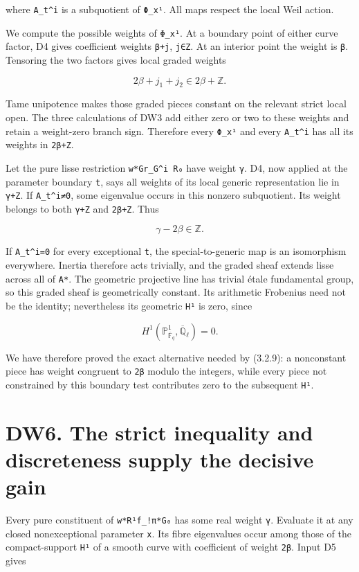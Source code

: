 \documentclass[
]{report}
\newcounter{none} %
\begin{document}
where \texttt{A\_t\^{}i} is a subquotient of \texttt{Φ\_x¹}. All maps
respect the local Weil action.

We compute the possible weights of \texttt{Φ\_x¹}. At a boundary point
of either curve factor, D4 gives coefficient weights \texttt{β+j},
\texttt{j∈Z}. At an interior point the weight is \texttt{β}. Tensoring
the two factors gives local graded weights

\[
2\beta+j_1+j_2\in2\beta+\mathbb Z.
\tag{DW5.4}
\]

Tame unipotence makes those graded pieces constant on the relevant
strict local open. The three calculations of DW3 add either zero or two
to these weights and retain a weight-zero branch sign. Therefore every
\texttt{Φ\_x¹} and every \texttt{A\_t\^{}i} has all its weights in
\texttt{2β+Z}.

Let the pure lisse restriction \texttt{w*Gr\_G\^{}i\ R₀} have weight
\texttt{γ}. D4, now applied at the parameter boundary \texttt{t}, says
all weights of its local generic representation lie in \texttt{γ+Z}. If
\texttt{A\_t\^{}i≠0}, some eigenvalue occurs in this nonzero
subquotient. Its weight belongs to both \texttt{γ+Z} and \texttt{2β+Z}.
Thus

\[
\gamma-2\beta\in\mathbb Z.
\tag{DW5.5}
\]

If \texttt{A\_t\^{}i=0} for every exceptional \texttt{t}, the
special-to-generic map is an isomorphism everywhere. Inertia therefore
acts trivially, and the graded sheaf extends lisse across all of
\texttt{A*}. The geometric projective line has trivial étale fundamental
group, so this graded sheaf is geometrically constant. Its arithmetic
Frobenius need not be the identity; nevertheless its geometric
\texttt{H¹} is zero, since

\[
H^1(\mathbb P^1_{\overline{\mathbb F}_q},\overline{\mathbb Q}_\ell)=0.
\tag{DW5.6}
\]

We have therefore proved the exact alternative needed by (3.2.9): a
nonconstant piece has weight congruent to \texttt{2β} modulo the
integers, while every piece not constrained by this boundary test
contributes zero to the subsequent \texttt{H¹}.

\section{DW6. The strict inequality and discreteness supply the decisive
gain}\label{dw6.-the-strict-inequality-and-discreteness-supply-the-decisive-gain}

Every pure constituent of \texttt{w*R¹f\_!π*G₀} has some real weight
\texttt{γ}. Evaluate it at any closed nonexceptional parameter
\texttt{x}. Its fibre eigenvalues occur among those of the
compact-support \texttt{H¹} of a smooth curve with coefficient of weight
\texttt{2β}. Input D5 gives
\end{document}
